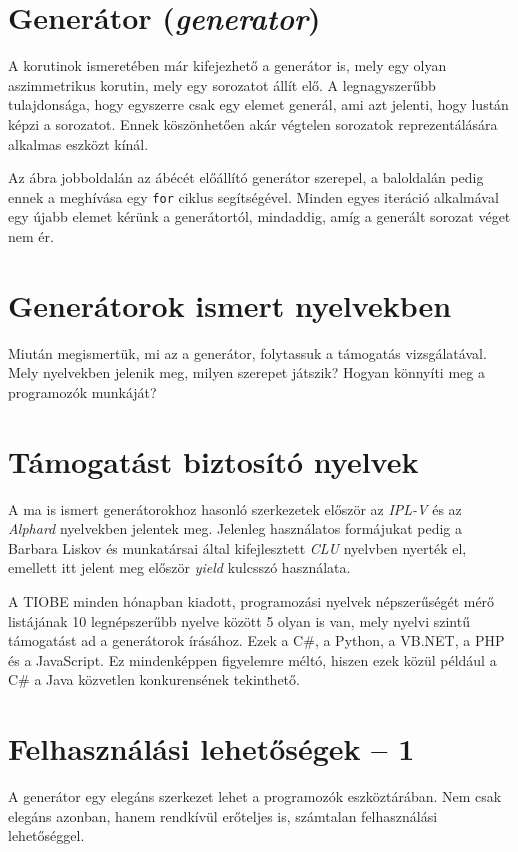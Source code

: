 \documentclass[12pt, a4paper]{article}
\begin{document}
\section{Generátor (\textit{generator})}

A korutinok ismeretében már kifejezhető a generátor is, mely egy olyan aszimmetrikus korutin, mely egy sorozatot állít elő. A legnagyszerűbb tulajdonsága, hogy egyszerre csak egy elemet generál, ami azt jelenti, hogy lustán képzi a sorozatot. Ennek köszönhetően akár végtelen sorozatok reprezentálására alkalmas eszközt kínál. 

Az ábra jobboldalán az ábécét előállító generátor szerepel, a baloldalán pedig ennek a meghívása egy \texttt{for} ciklus segítségével. Minden egyes iteráció alkalmával egy újabb elemet kérünk a generátortól, mindaddig, amíg a generált sorozat véget nem ér.

\section{Generátorok ismert nyelvekben}

Miután megismertük, mi az a generátor, folytassuk a támogatás vizsgálatával. Mely nyelvekben jelenik meg, milyen szerepet játszik? Hogyan könnyíti meg a programozók munkáját?

\section{Támogatást biztosító nyelvek}

A ma is ismert generátorokhoz hasonló szerkezetek először az \textit{IPL-V} és az \textit{Alphard} nyelvekben jelentek meg. Jelenleg használatos formájukat pedig a Barbara Liskov és munkatársai által kifejlesztett \textit{CLU} nyelvben nyerték el, emellett itt jelent meg először \textit{yield} kulcsszó használata.

A TIOBE minden hónapban kiadott, programozási nyelvek népszerűségét mérő listájának 10 legnépszerűbb nyelve között 5 olyan is van, mely nyelvi szintű támogatást ad a generátorok írásához. Ezek a C\#, a Python, a VB.NET, a PHP és a JavaScript. Ez mindenképpen figyelemre méltó, hiszen ezek közül például a C\# a Java közvetlen konkurensének tekinthető.

\section{Felhasználási lehetőségek -- 1}

A generátor egy elegáns szerkezet lehet a programozók eszköztárában. Nem csak elegáns azonban, hanem rendkívül erőteljes is, számtalan felhasználási lehetőséggel.
\end{document}
